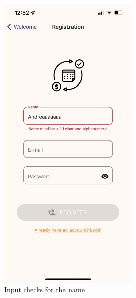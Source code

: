 \documentclass[11pt]{article}
\begin{document}
\begin{figure}[h!]
\begin{minipage}[c]{0.45\textwidth}
        \includegraphics[width=0.6\textwidth, clip]{../../assets/smartphone/regName.PNG}
        \caption{Input checks for the name}
        \label{fig:rname}
    \end{minipage}
\end{figure}
\end{document}
